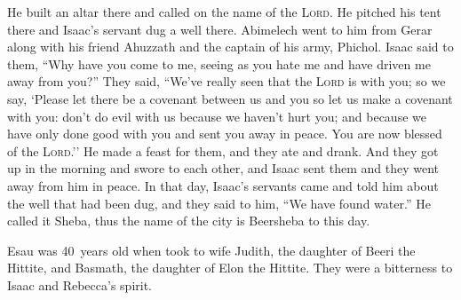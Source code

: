 \begin{inparaenum}
   He built an altar there and called on the name of the \textsc{Lord}. He pitched his tent there and Isaac's servant dug a well there.%
   Abimelech went to him from Gerar along with his friend Ahuzzath and the captain of his army, Phichol.%
   Isaac said to them, ``Why have you come to me, seeing as you hate me and have driven me away from you?''%
   They said, ``We've really seen that the \textsc{Lord} is with you; so we say, `Please let there be a covenant between us and you so let us make a covenant with you:%
   don't do evil with us because we haven't hurt you; and because we have only done good with you and sent you away in peace. You are now blessed of the \textsc{Lord}.''%
   He made a feast for them, and they ate and drank.%
   And they got up in the morning and swore to each other, and Isaac sent them and they went away from him in peace.%
   In that day, Isaac's servants came and told him about the well that had been dug, and they said to him, ``We have found water.''%
   He called it Sheba, thus the name of the city is Beersheba to this day.%
  
   Esau was 40~years old when took to wife Judith, the daughter of Beeri the Hittite, and Basmath, the daughter of Elon the Hittite.%
   They were a bitterness to Isaac and Rebecca's spirit.%
\end{inparaenum}
